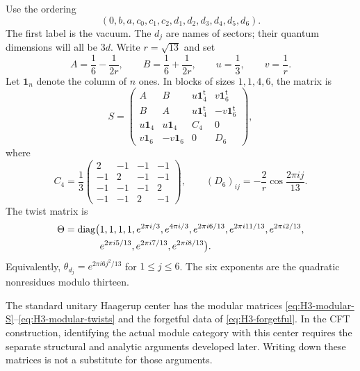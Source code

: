 Use the ordering
\begin{equation}
 (0,b,a,c_0,c_1,c_2,d_1,d_2,d_3,d_4,d_5,d_6).
 \label{eq:H3-center-order}
\end{equation}
The first label is the vacuum. The $d_j$ are names of sectors;
their quantum dimensions will all be $3d$. Write $r=\sqrt{13}$ and set
\[
 A=\frac16-\frac1{2r},\qquad
 B=\frac16+\frac1{2r},\qquad
 u=\frac13,\qquad v=\frac1r.
\]
Let $\mathbf1_n$ denote the column of $n$ ones. In blocks of
sizes $1,1,4,6$, the matrix is
\begin{equation}
 S=\begin{pmatrix}
 A&B&u\mathbf1_4^{\mathsf t}&v\mathbf1_6^{\mathsf t}\\
 B&A&u\mathbf1_4^{\mathsf t}&-v\mathbf1_6^{\mathsf t}\\
 u\mathbf1_4&u\mathbf1_4&C_4&0\\
 v\mathbf1_6&-v\mathbf1_6&0&D_6
 \end{pmatrix},
 \label{eq:H3-modular-S}
\end{equation}
where
\begin{equation}
 C_4=\frac13\begin{pmatrix}
 2&-1&-1&-1\\
 -1&2&-1&-1\\
 -1&-1&-1&2\\
 -1&-1&2&-1
 \end{pmatrix},\qquad
 (D_6)_{ij}=-\frac2r\cos\frac{2\pi ij}{13}.
 \label{eq:H3-modular-blocks}
\end{equation}
The twist matrix is
\begin{align}
 \Theta=\operatorname{diag}\bigl(&1,1,1,1,
 e^{2\pi i/3},e^{4\pi i/3},
 e^{2\pi i6/13},e^{2\pi i11/13},e^{2\pi i2/13},\notag\\
 &e^{2\pi i5/13},e^{2\pi i7/13},e^{2\pi i8/13}\bigr).
 \label{eq:H3-modular-twists}
\end{align}
Equivalently, $\theta_{d_j}=e^{2\pi i6j^2/13}$ for
$1\leq j\leq6$.  The six exponents are the quadratic nonresidues
modulo thirteen.

\begin{constructioninput}
The standard unitary Haagerup center has the modular matrices
\eqref{eq:H3-modular-S}--\eqref{eq:H3-modular-twists} and the
forgetful data of \eqref{eq:H3-forgetful}.  In the CFT construction,
identifying the actual module category with this center requires
the separate structural and analytic arguments developed later.
Writing down these matrices is not a substitute for those arguments.
\end{constructioninput}

